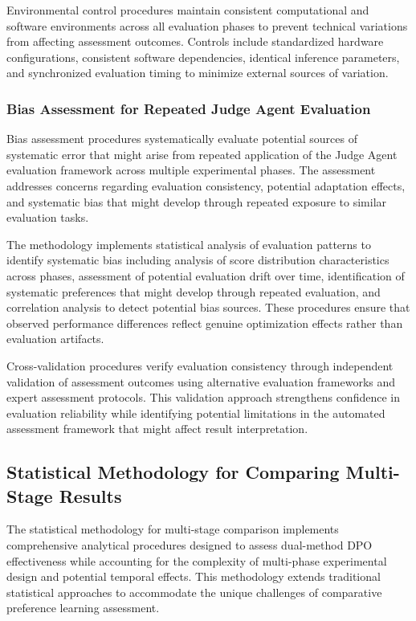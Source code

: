 Environmental control procedures maintain consistent computational and software environments across all evaluation phases to prevent technical variations from affecting assessment outcomes. Controls include standardized hardware configurations, consistent software dependencies, identical inference parameters, and synchronized evaluation timing to minimize external sources of variation.

\subsubsection{Bias Assessment for Repeated Judge Agent Evaluation}

Bias assessment procedures systematically evaluate potential sources of systematic error that might arise from repeated application of the Judge Agent evaluation framework across multiple experimental phases. The assessment addresses concerns regarding evaluation consistency, potential adaptation effects, and systematic bias that might develop through repeated exposure to similar evaluation tasks.

The methodology implements statistical analysis of evaluation patterns to identify systematic bias including analysis of score distribution characteristics across phases, assessment of potential evaluation drift over time, identification of systematic preferences that might develop through repeated evaluation, and correlation analysis to detect potential bias sources. These procedures ensure that observed performance differences reflect genuine optimization effects rather than evaluation artifacts.

Cross-validation procedures verify evaluation consistency through independent validation of assessment outcomes using alternative evaluation frameworks and expert assessment protocols. This validation approach strengthens confidence in evaluation reliability while identifying potential limitations in the automated assessment framework that might affect result interpretation.

\subsection{Statistical Methodology for Comparing Multi-Stage Results}

The statistical methodology for multi-stage comparison implements comprehensive analytical procedures designed to assess dual-method DPO effectiveness while accounting for the complexity of multi-phase experimental design and potential temporal effects. This methodology extends traditional statistical approaches to accommodate the unique challenges of comparative preference learning assessment.

